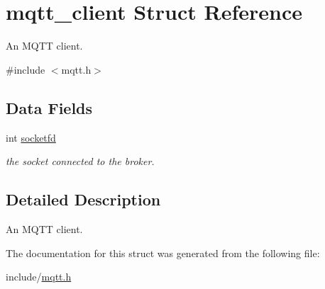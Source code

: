 \hypertarget{structmqtt__client}{}\section{mqtt\+\_\+client Struct Reference}
\label{structmqtt__client}


An M\+Q\+TT client.  




{\ttfamily \#include $<$mqtt.\+h$>$}

\subsection*{Data Fields}
\begin{DoxyCompactItemize}
\item 
int \hyperlink{structmqtt__client_a9ba39ec6a412d49792bf5f106754eac1}{socketfd}\hypertarget{structmqtt__client_a9ba39ec6a412d49792bf5f106754eac1}{}\label{structmqtt__client_a9ba39ec6a412d49792bf5f106754eac1}

\begin{DoxyCompactList}\small\item\em the socket connected to the broker. \end{DoxyCompactList}\end{DoxyCompactItemize}


\subsection{Detailed Description}
An M\+Q\+TT client. 

The documentation for this struct was generated from the following file\+:\begin{DoxyCompactItemize}
\item 
include/\hyperlink{mqtt_8h}{mqtt.\+h}\end{DoxyCompactItemize}
